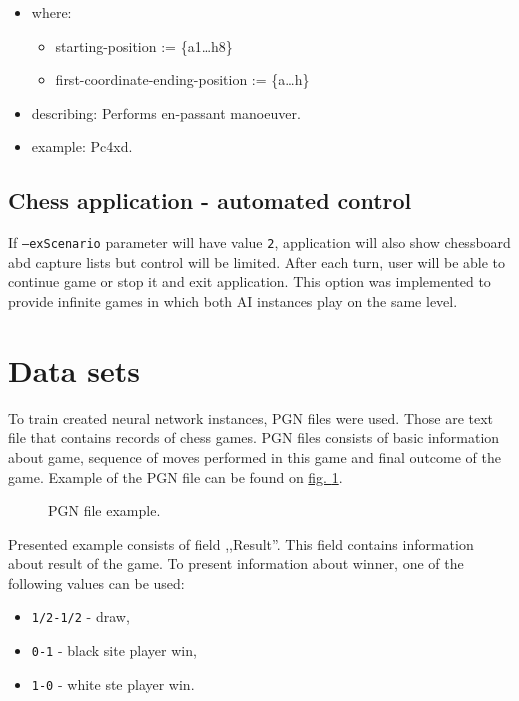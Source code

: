 \begin{itemize}
        \begin{itemize}[label={}]
            \item where:
            \begin{itemize}[label={}]
                \item starting-position := \{a1\dots h8\}
                \item first-coordinate-ending-position := \{a\dots h\} 
            \end{itemize}
            \item describing: Performs en-passant manoeuver.
            \item example: Pc4xd.
        \end{itemize}
\end{itemize}

\subsection{Chess application - automated control}
If \texttt{--exScenario} parameter will have value \texttt{2}, application will also show chessboard abd capture lists but control will be limited. After each turn, user will be able to continue game or stop it and exit application. This option was implemented to provide infinite games in which both AI instances play on the same level.

\section{Data sets}\label{sec:data-sets}
To train created neural network instances, PGN files were used. Those are text file that contains records of chess games. PGN files consists of basic information about game, sequence of moves performed in this game and final outcome of the game. Example of the PGN file can be found on \hyperref[fig:pgn-example]{fig. \ref*{fig:pgn-example}}.
\begin{figure}
    \centering
    \caption{PGN file example.}
    \label{fig:pgn-example}
\end{figure}
Presented example consists of field ,,Result''. This field contains information about result of the game. To present information about winner, one of the following values can be used:
\begin{itemize}
    \item \texttt{1/2-1/2} - draw,
    \item \texttt{0-1} - black site player win,
    \item \texttt{1-0} - white ste player win.
\end{itemize}


